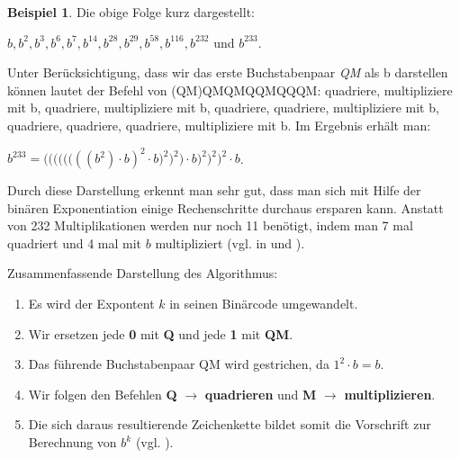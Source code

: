 \documentclass[12pt,a4paper]{article}
\theoremstyle{definition}
\newtheorem{bsp}{Beispiel}[subsection]
\begin{document}
\begin{bsp}
Die obige Folge kurz dargestellt:
\begin{center}
$b, b^2, b^3, b^6, b^7, b^{14}, b^{28}, b^{29}, b^{58}, b^{116}, b^{232}$ und $b^{233}$.
\end{center}

Unter Berücksichtigung, dass wir das erste Buchstabenpaar \textit{QM} als b darstellen können lautet der Befehl von (QM)QMQMQQMQQQM: quadriere, multipliziere mit b, quadriere, multipliziere mit b, quadriere, quadriere, multipliziere mit b, quadriere, quadriere, quadriere, multipliziere mit b.\newline
Im Ergebnis erhält man:
\begin{center}
$b^{233} = \Biggl(\Biggl(\biggl(\biggl(\bigl(\bigl(((b^2)\cdot b)^2 \cdot b\bigr)^2\bigr)^2\biggr) \cdot b\biggr)^2\Biggr)^2\Biggr)^2 \cdot b$.
\end{center}
\end{bsp}

Durch diese Darstellung erkennt man sehr gut, dass man sich mit Hilfe der binären Exponentiation einige Rechenschritte durchaus ersparen kann.
Anstatt von 232 Multiplikationen werden nur noch 11 benötigt, indem man 7 mal quadriert und 4 mal mit $b$ multipliziert (vgl. \cite{Knuth1971} in \cite[117--121]{Arndt2000} und \cite[460--461]{Crandall2005}).

Zusammenfassende Darstellung des Algorithmus:
\begin{enumerate}
    \item Es wird der Expontent $k$ in seinen Binärcode umgewandelt.
    \item Wir ersetzen jede \textbf{0} mit \textbf{Q} und jede \textbf{1} mit \textbf{QM}.
    \item Das führende Buchstabenpaar QM wird gestrichen, da ${1^2 \cdot b = b}$.
    \item Wir folgen den Befehlen \textbf{Q} $\rightarrow$ \textbf{quadrieren} und \textbf{M} $\rightarrow$ \textbf{multiplizieren}.
    \item Die sich daraus resultierende Zeichenkette bildet somit die Vorschrift zur Berechnung von $b^k$ (vgl. \cite{Academic2020}).
\end{enumerate}
\end{document}
